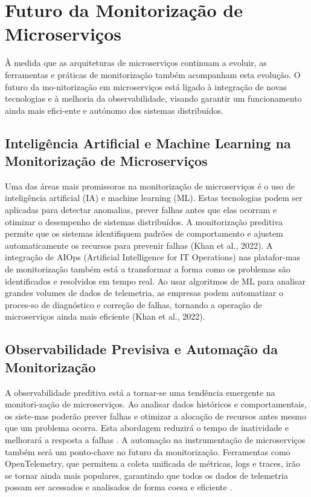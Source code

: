 \section{Futuro da Monitorização de Microserviços}

À medida que as arquiteturas de microserviços continuam a evoluir, as ferramentas e práticas de monitorização também acompanham esta evolução. O futuro da mo-nitorização em microserviços está ligado à integração de novas tecnologias e à melhoria da observabilidade, visando garantir um funcionamento ainda mais efici-ente e autónomo dos sistemas distribuídos.

\subsection{Inteligência Artificial e Machine Learning na Monitorização de Microserviços}

Uma das áreas mais promissoras na monitorização de microserviços é o uso de inteligência artificial (IA) e machine learning (ML). Estas tecnologias podem ser aplicadas para detectar anomalias, prever falhas antes que elas ocorram e otimizar o desempenho de sistemas distribuídos. A monitorização preditiva permite que os sistemas identifiquem padrões de comportamento e ajustem automaticamente os recursos para prevenir falhas (Khan et al., 2022).
A integração de AIOps (Artificial Intelligence for IT Operations) nas platafor-mas de monitorização também está a transformar a forma como os problemas são identificados e resolvidos em tempo real. Ao usar algoritmos de ML para analisar grandes volumes de dados de telemetria, as empresas podem automatizar o proces-so de diagnóstico e correção de falhas, tornando a operação de microserviços ainda mais eficiente (Khan et al., 2022).

\subsection{Observabilidade Previsiva e Automação da Monitorização}

A observabilidade preditiva está a tornar-se uma tendência emergente na monitori-zação de microserviços. Ao analisar dados históricos e comportamentais, os siste-mas poderão prever falhas e otimizar a alocação de recursos antes mesmo que um problema ocorra. Esta abordagem reduzirá o tempo de inatividade e melhorará a resposta a falhas \cite{Kusuma2022}.
A automação na instrumentação de microserviços também será um ponto-chave no futuro da monitorização. Ferramentas como OpenTelemetry, que permitem a coleta unificada de métricas, logs e traces, irão se tornar ainda mais populares, garantindo que todos os dados de telemetria possam ser acessados e analisados de forma coesa e eficiente \cite{Kusuma2022}.

